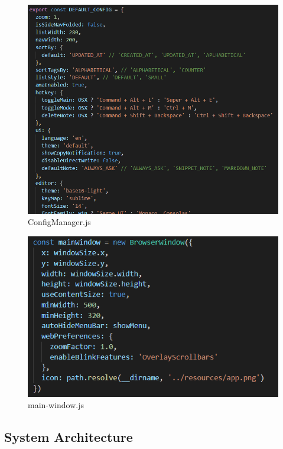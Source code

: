 \documentclass[main.tex]{subfiles}
\begin{document}
\begin{figure}[htbp]
\includegraphics[scale=0.5]{images/export.png}
\centering
\caption{ConfigManager.js}
\label{fig:configmanager}
\end{figure}
\clearpage

\begin{figure}[htbp]
\includegraphics[scale=0.7]{images/mainWindow.png}
\centering
\caption{main-window.js}
\label{fig:main-window}
\end{figure}
\clearpage

\subsection{System Architecture}
\label{subsec:arch2554}
\end{document}
